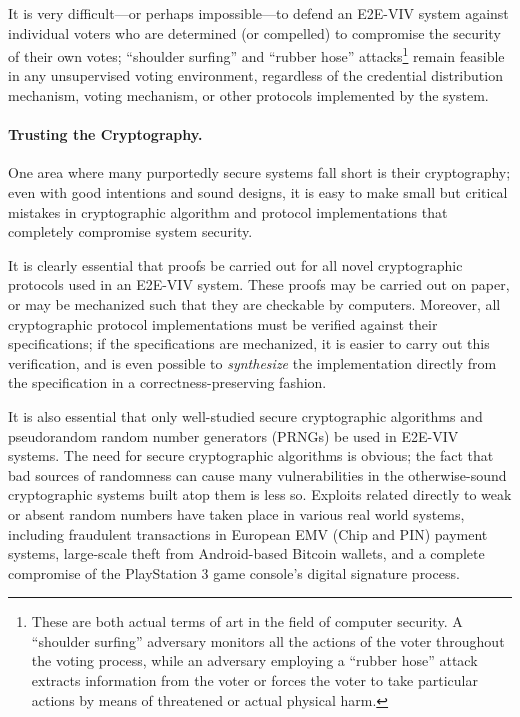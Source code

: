 It is very difficult---or perhaps impossible---to defend an E2E-VIV
system against individual voters who are determined (or compelled) to
compromise the security of their own votes; ``shoulder surfing'' and
``rubber hose'' attacks\footnote{These are both actual terms of art in
  the field of computer security. A ``shoulder surfing'' adversary
  monitors all the actions of the voter throughout the voting process,
  while an adversary employing a ``rubber hose'' attack extracts
  information from the voter or forces the voter to take particular
  actions by means of threatened or actual physical harm.} remain
feasible in any unsupervised voting environment, regardless of the
credential distribution mechanism, voting mechanism, or other
protocols implemented by the system.

\paragraph{Trusting the Cryptography.} One area where many purportedly
secure systems fall short is their cryptography; even with good
intentions and sound designs, it is easy to make small but critical
mistakes in cryptographic algorithm and protocol implementations that
completely compromise system security.

It is clearly essential that proofs be carried out for all novel
cryptographic protocols used in an E2E-VIV system. These proofs may be
carried out on paper, or may be mechanized such that they are
checkable by computers. Moreover, all cryptographic protocol
implementations must be verified against their specifications; if the
specifications are mechanized, it is easier to carry out this
verification, and is even possible to \emph{synthesize} the
implementation directly from the specification in a
correctness-preserving fashion.

It is also essential that only well-studied secure cryptographic
algorithms and pseudorandom random number generators (PRNGs) be used
in E2E-VIV systems. The need for secure cryptographic algorithms is
obvious; the fact that bad sources of randomness can cause many
vulnerabilities in the otherwise-sound cryptographic systems built
atop them is less so. Exploits related directly to weak or absent
random numbers have taken place in various real world systems,
including fraudulent transactions in European EMV (Chip and PIN)
payment systems, large-scale theft from Android-based Bitcoin wallets,
and a complete compromise of the PlayStation 3 game console's digital
signature process.

